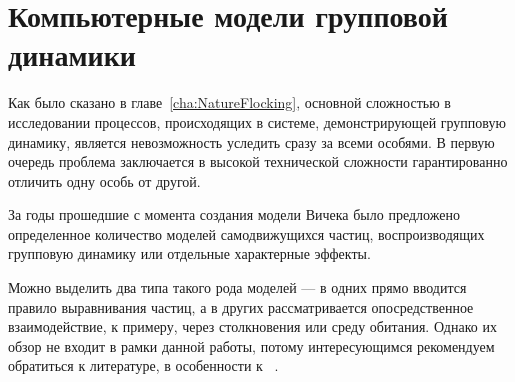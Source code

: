 \chapter{Компьютерные модели групповой динамики}
\label{ch:ComputerModelsOfHords}
Как было сказано в главе~\ref{cha:NatureFlocking}, основной сложностью в исследовании процессов, происходящих в системе, демонстрирующей групповую динамику, является невозможность уследить сразу за всеми особями. В первую очередь проблема заключается в высокой технической сложности гарантированно отличить одну особь от другой.



За годы прошедшие с момента создания модели Вичека было предложено определенное количество моделей самодвижущихся частиц, воспроизводящих групповую динамику или отдельные характерные эффекты.

Можно выделить два типа такого рода моделей --- в одних прямо вводится правило выравнивания частиц, а в других рассматривается опосредственное взаимодействие, к примеру, через столкновения или среду обитания. Однако их обзор не входит в рамки данной работы, потому интересующимся рекомендуем обратиться к литературе, в особенности к ~\cite{vicsek2012}.